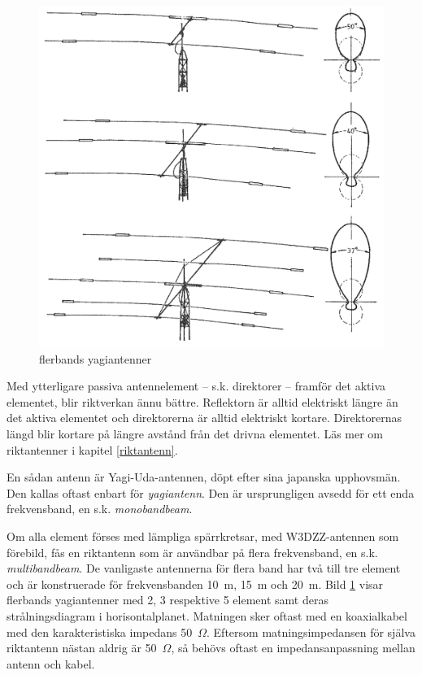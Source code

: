 \begin{figure}
  \includegraphics[width=\textwidth]{images/cropped_pdfs/bild_2_6-18.pdf}
  \caption{flerbands yagiantenner}
  \label{fig:bildII6-18}
\end{figure}

Med ytterligare passiva antennelement -- s.k. direktorer -- framför det
aktiva elementet, blir riktverkan ännu bättre.
Reflektorn är alltid elektriskt längre än det aktiva elementet och direktorerna
är alltid elektriskt kortare.
Direktorernas längd blir kortare på längre avstånd från det drivna elementet.
Läs mer om riktantenner i kapitel \ref{riktantenn}.

En sådan antenn är Yagi-Uda-antennen, döpt efter sina japanska upphovsmän.
Den kallas oftast enbart för \emph{yagiantenn}.
Den är ursprungligen avsedd för ett enda frekvensband, en s.k.
\emph{monobandbeam}.

Om alla element förses med lämpliga spärrkretsar, med W3DZZ-antennen som
förebild, fås en riktantenn som är användbar på flera frekvensband, en s.k.
\emph{multibandbeam}.
De vanligaste antennerna för flera band har två till tre element och är
konstruerade för frekvensbanden 10~m, 15~m och 20~m.
Bild \ref{fig:bildII6-18} visar flerbands yagiantenner med 2, 3 respektive 5
element samt deras strålningsdiagram i horisontalplanet.
Matningen sker oftast med en koaxialkabel med den karakteristiska impedans 50~\(\Omega\).
Eftersom matningsimpedansen för själva riktantenn nästan aldrig är
50~\(\Omega\), så behövs oftast en impedansanpassning mellan antenn och kabel.


